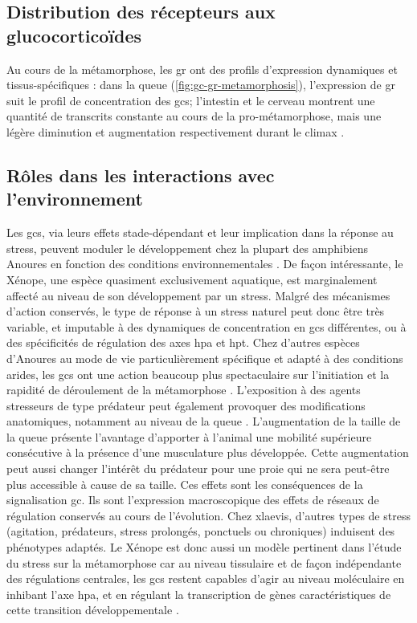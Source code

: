 \documentclass[../main.tex]{subfiles}
\begin{document}
\subsection{Distribution des récepteurs aux glucocorticoïdes}
Au cours de la métamorphose, les \gls{gr} ont des profils d'expression dynamiques et tissus-spécifiques :
dans la queue (\autoref{fig:gc-gr-metamorphosis}), l'expression de \gls{gr} suit le profil de concentration des \glspl{gc}; l'intestin et le cerveau montrent une quantité de transcrits constante au cours de la pro-métamorphose, mais une légère diminution et augmentation respectivement durant le climax \citep{Krain2004}.

\subsection{Rôles dans les interactions avec l'environnement}
Les \glspl{gc}, via leurs effets stade-dépendant et leur implication dans la réponse au stress, peuvent moduler le développement chez la plupart des amphibiens Anoures en fonction des conditions environnementales \citep{Denver2009}.
De façon intéressante, le Xénope, une espèce quasiment exclusivement aquatique, est marginalement affecté au niveau de son développement par un stress.
Malgré des mécanismes d'action conservés, le type de réponse à un stress naturel peut donc être très variable, et imputable à des dynamiques de concentration en \glspl{gc} différentes, ou à des spécificités de régulation des axes \gls{hpa} et \gls{hpt}.
Chez d'autres espèces d'Anoures au mode de vie particulièrement spécifique  et adapté à des conditions arides, les \glspl{gc} ont une action beaucoup plus spectaculaire sur l'initiation et la rapidité de déroulement de la métamorphose \citep{Kulkarni2011,Gomez-Mestre2013a}.
L'exposition à des agents stresseurs de type prédateur peut également provoquer des modifications anatomiques, notamment au niveau de la queue \citep{Maher2013}.
L'augmentation de la taille de la queue présente l'avantage d'apporter à l'animal une mobilité supérieure consécutive à la présence d'une musculature plus développée. Cette augmentation peut aussi changer l'intérêt du prédateur pour une proie qui ne sera peut-être plus accessible à cause de sa taille.
Ces effets sont les conséquences de la signalisation \gls{gc}.
Ils sont l'expression macroscopique des effets de réseaux de régulation conservés au cours de l'évolution.
Chez \gls{xlaevis}, d'autres types de stress (agitation, prédateurs, stress prolongés, ponctuels ou chroniques) induisent des phénotypes adaptés.
Le Xénope est donc aussi un modèle pertinent dans l'étude du stress sur la métamorphose car au niveau tissulaire et de façon indépendante des régulations centrales, les \glspl{gc} restent capables d'agir au niveau moléculaire en inhibant l'axe \gls{hpa}, et en régulant la transcription de gènes caractéristiques de cette transition développementale \citep{Hu2008,Bonett2010}.
\end{document}
